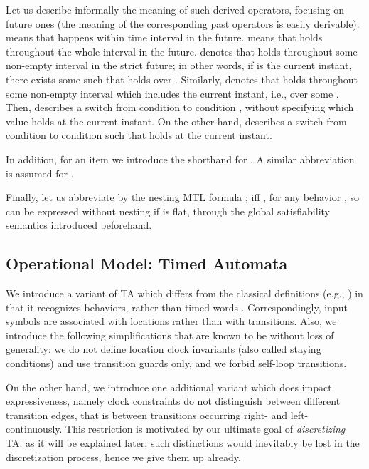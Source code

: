 \documentclass[a4paper]{article}
\theoremstyle{plain}
\theoremstyle{definition}
\begin{document}
Let us describe informally the meaning of such derived operators, focusing on future ones (the meaning of the corresponding past operators is easily derivable).
 means that  happens within time interval  in the future.
 means that  holds throughout the whole interval  in the future.
 denotes that  holds throughout some non-empty interval in the strict future; in other words, if  is the current instant, there exists some  such that  holds over .
Similarly,  denotes that  holds throughout some non-empty interval which includes the current instant, i.e., over some .
Then,  describes a switch from condition  to condition , without specifying which value holds at the current instant.
On the other hand,  describes a switch from condition  to condition  such that  holds at the current instant.

In addition, for an item  we introduce the shorthand  for .
A similar abbreviation is assumed for .

Finally, let us abbreviate by  the nesting MTL formula ;  iff , for any behavior , so  can be expressed without nesting if  is flat, through the global satisfiability semantics introduced beforehand.









\subsection{Operational Model: Timed Automata} \label{sec:timedautomata}
We introduce a variant of TA which differs from the classical definitions (e.g., \cite{AD94}) in that it recognizes behaviors, rather than timed words \cite{AFH96,MNP06}.
Correspondingly, input symbols are associated with locations rather than with transitions.
Also, we introduce the following simplifications that are known to be without loss of generality: we do not define location clock invariants (also called staying conditions) and use transition guards only, and we forbid self-loop transitions.

On the other hand, we introduce one additional variant which does impact expressiveness, namely clock constraints do not distinguish between different transition edges, that is between transitions occurring right- and left-continuously.
This restriction is motivated by our ultimate goal of \emph{discretizing} TA: as it will be explained later, such distinctions would inevitably be lost in the discretization process, hence we give them up already.
\end{document}
